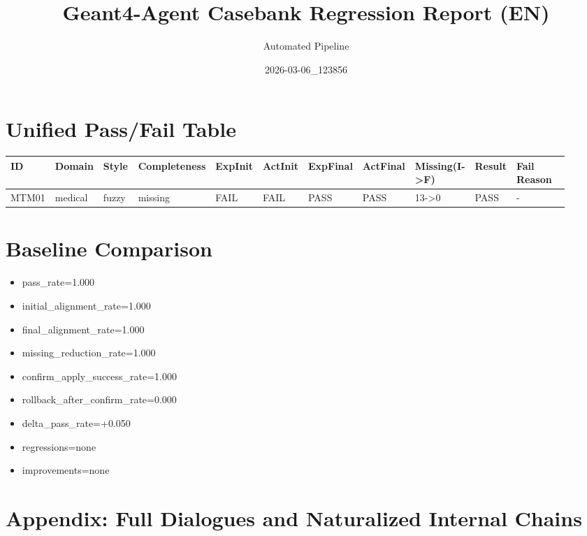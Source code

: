 \documentclass[11pt]{ctexart}
\title{Geant4-Agent Casebank Regression Report (EN)}
\author{Automated Pipeline}
\date{2026-03-06\_123856}
\begin{document}
\maketitle
\section{Unified Pass/Fail Table}
\begin{longtable}{p{0.06\linewidth}p{0.08\linewidth}p{0.07\linewidth}p{0.08\linewidth}p{0.07\linewidth}p{0.07\linewidth}p{0.07\linewidth}p{0.07\linewidth}p{0.09\linewidth}p{0.06\linewidth}p{0.21\linewidth}}
\toprule
ID & Domain & Style & Completeness & ExpInit & ActInit & ExpFinal & ActFinal & Missing(I->F) & Result & Fail Reason \\
\midrule
MTM01 & medical & fuzzy & missing & FAIL & FAIL & PASS & PASS & 13->0 & PASS & - \\
\bottomrule
\end{longtable}
\section{Baseline Comparison}
\begin{itemize}
\item pass\_rate=1.000
\item initial\_alignment\_rate=1.000
\item final\_alignment\_rate=1.000
\item missing\_reduction\_rate=1.000
\item confirm\_apply\_success\_rate=1.000
\item rollback\_after\_confirm\_rate=0.000
\item delta\_pass\_rate=+0.050
\item regressions=none
\item improvements=none
\end{itemize}
\appendix
\section{Appendix: Full Dialogues and Naturalized Internal Chains}
\end{document}
